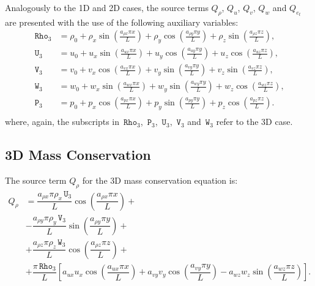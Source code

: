 \documentclass[10pt]{article}
\newcommand{\Rho}{\,\mathtt{Rho}}
\newcommand{\PP}{\,\mathtt{P}}
\newcommand{\U}{\,\mathtt{U}}
\newcommand{\V}{\,\mathtt{V}}
\newcommand{\W}{\,\mathtt{W}}
\begin{document}
Analogously to the 1D and 2D cases, the source terms $Q_\rho$, $Q_u$, $Q_v$, $Q_w$ and $Q_{e_t}$ are  presented with the use of the following auxiliary variables:
\begin{equation*}
 \begin{split}
\label{eq:aux}
\Rho_3 &= \rho_{0}+ \rho_{x} \sin\left(\frac{a_{ \rho  x} \pi x}{L}\right)+ \rho_{y} \cos\left(\frac{a_{ \rho  y} \pi y}{L}\right) + \rho_{z} \sin\left(\frac{a_{ \rho  z} \pi z}{L}\right),\\
\U_3 &=u_{0}+u_{x} \sin\left(\frac{a_{u  x} \pi x}{L}\right)+u_{y} \cos\left(\frac{a_{u  y} \pi y}{L}\right)+u_{z} \cos\left(\frac{a_{u  z} \pi z}{L}\right) ,\\
\V_3 &= v_{0}+v_{x} \cos\left(\frac{a_{v  x} \pi x}{L}\right)+v_{y} \sin\left(\frac{a_{v  y} \pi y}{L}\right)+v_{z} \sin\left(\frac{a_{v  z} \pi z}{L}\right), \\
\W_3 &= w_{0}+w_{x} \sin\left(\frac{a_{w  x} \pi x}{L}\right)+w_{y} \sin\left(\frac{a_{w  y} \pi y}{L}\right)+ w_{z} \cos\left(\frac{a_{w  z} \pi z}{L}\right) ,\\
\PP_3 &= p_{0}+p_{x} \cos\left(\frac{a_{p  x} \pi x}{L}\right)+p_{y} \sin\left(\frac{a_{p  y} \pi y}{L}\right)+ p_{z} \cos\left(\frac{a_{p  z} \pi z}{L}\right).\\
\end{split}
\end{equation*}
where, again, the subscripts in $\Rho_3$, $\PP_3$, $\U_3$, $\V_3$ and $\W_3$ refer to the 3D case.

\subsection{3D Mass Conservation}

The source term $Q_{\rho}$ for the 3D mass conservation equation is:
\begin{equation}
 \begin{split}
Q_\rho &=\dfrac{ a_{\rho x} \pi \rho_x \U_3}{L} \cos\left(\dfrac{a_{\rho x} \pi x}{L}\right)+\\
&-\dfrac{a_{\rho y} \pi \rho_y \V_3 }{L}\sin\left(\dfrac{a_{\rho y} \pi y}{L}\right)+\\
&+\dfrac{a_{\rho z} \pi \rho_z \W_3 }{L}\cos\left(\dfrac{a_{\rho z}\pi z }{L}\right)+\\
&+\dfrac{\pi \Rho_3}{L}\left[a_{ux} u_x \cos\left(\dfrac{a_{ux} \pi x}{L}\right)+a_{vy} v_y \cos\left(\dfrac{a_{vy} \pi y}{L}\right)-a_{wz} w_z \sin\left(\dfrac{a_{wz}\pi z }{L}\right)\right].
 \end{split}
\end{equation}
\end{document}

